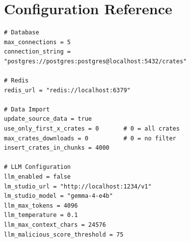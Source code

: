 \chapter{Configuration Reference}\label{appendix:config-ref}

\begin{verbatim}
# Database
max_connections = 5
connection_string = "postgres://postgres:postgres@localhost:5432/crates"

# Redis
redis_url = "redis://localhost:6379"

# Data Import
update_source_data = true
use_only_first_x_crates = 0       # 0 = all crates
max_crates_downloads = 0          # 0 = no filter
insert_crates_in_chunks = 4000

# LLM Configuration
llm_enabled = false
lm_studio_url = "http://localhost:1234/v1"
lm_studio_model = "gemma-4-e4b"
llm_max_tokens = 4096
llm_temperature = 0.1
llm_max_context_chars = 24576
llm_malicious_score_threshold = 75
\end{verbatim}